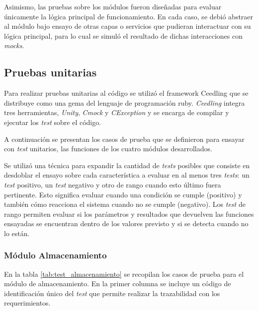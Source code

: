Asimismo, las pruebas sobre los módulos fueron diseñadas para evaluar únicamente la lógica principal de funcionamiento.  En cada caso, se debió abstraer al módulo bajo ensayo de otras capas o servicios que pudieran interactuar con su lógica principal, para lo cual se simuló el resultado de dichas interacciones con \textit{mocks}. 


\subsection{Pruebas unitarias}
\label{subsec:unitarias}

Para realizar pruebas unitarias al código se utilizó el framework Ceedling \citep{ceedling} que se distribuye como una gema del lenguaje de programación ruby.  \textit{Ceedling} integra tres herramientas, \textit{Unity}, \textit{Cmock} y \textit{CException} y se encarga de compilar y ejecutar los \textit{test} sobre el código.

A continuación se presentan los casos de prueba que se definieron para ensayar con \textit{test} unitarios, las funciones de los cuatro módulos desarrollados.  

Se utilizó una técnica para expandir la cantidad de \textit{tests} posibles que consiste en desdoblar el ensayo sobre cada característica a evaluar en al menos tres \textit{tests}: un \textit{test} positivo, un \textit{test} negativo y otro de rango cuando esto último fuera pertinente.  Esto significa evaluar cuando una condición se cumple (positivo) y también cómo reacciona el sistema cuando no se cumple (negativo).  Los \textit{test} de rango permiten evaluar si los parámetros y resultados que devuelven las funciones ensayadas se encuentran dentro de los valores previsto y si se detecta cuando no lo están.

\subsubsection{Módulo Almacenamiento}

En la tabla \ref{tab:test_almacenamiento} se recopilan los casos de prueba para el módulo de almacenamiento.  En la primer columna se incluye un código de identificación único del \textit{test} que permite realizar la trazabilidad con los requerimientos.

